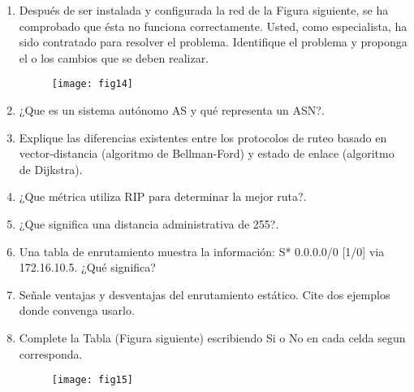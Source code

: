 \documentclass{udparticle}
\begin{document}
\begin{enumerate}
\item Después de ser instalada y configurada la red de la Figura siguiente, se ha 
comprobado que ésta no funciona correctamente. Usted, como especialista, ha sido 
contratado para resolver el problema. Identifique el problema y proponga el o los 
cambios que se deben realizar.
	\begin{figure}[H]
	\centering
	\texttt{[image: fig14]}
	\end{figure}

\item ¿Que es un sistema autónomo AS y qué representa un ASN?.
\item Explique las diferencias existentes entre los protocolos de ruteo basado en
vector-distancia (algoritmo de Bellman-Ford) y estado de enlace (algoritmo de Dijkstra).

\item ¿Que métrica utiliza RIP para determinar la mejor ruta?.
\item ¿Que significa una distancia administrativa de 255?.
\item Una tabla de enrutamiento muestra la información: S* 0.0.0.0/0 [1/0] via 172.16.10.5. ¿Qué significa?
\item Señale ventajas y desventajas del enrutamiento estático. Cite dos ejemplos donde convenga usarlo.
\item Complete la Tabla (Figura siguiente) escribiendo Si o No en cada celda segun corresponda.
	\begin{figure}[H]
	\centering
	\texttt{[image: fig15]}
	\end{figure}


\end{enumerate}
\end{document}
